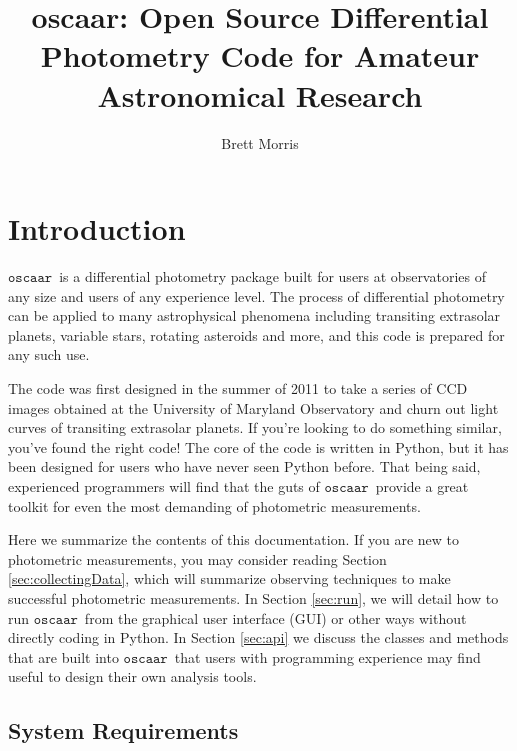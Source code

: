 \documentclass{article}
\begin{document}
\title{\textbf{oscaar}: Open Source Differential Photometry Code for Amateur Astronomical Research}
\author{Brett Morris}
\maketitle
\tableofcontents
\section{Introduction}

\newcommand{\oscaar}{$ \mathtt{oscaar}$\ }
\newcommand{\code}[1]{\texttt{#1}}
\newcommand{\init}{\code{init.par}\ }

\oscaar is a differential photometry package built for users at observatories of any size and users of any experience level. The process of differential photometry can be applied to many astrophysical phenomena including transiting extrasolar planets, variable stars, rotating asteroids and more, and this code is prepared for any such use. 

The code was first designed in the summer of 2011 to take a series of CCD images obtained at the University of Maryland Observatory and churn out light curves of transiting extrasolar planets. If you're looking to do something similar, you've found the right code! The core of the code is written in Python, but it has been designed for users who have never seen Python before. That being said, experienced programmers will find that the guts of \oscaar provide a great toolkit for even the most demanding of photometric measurements.

Here we summarize the contents of this documentation. If you are new to photometric measurements, you may consider reading Section \ref{sec:collectingData}, which will summarize observing techniques to make successful photometric measurements. In Section \ref{sec:run}, we will detail how to run \oscaar from the graphical user interface (GUI) or other ways without directly coding in Python. In Section \ref{sec:api} we discuss the classes and methods that are built into \oscaar that users with programming experience may find useful to design their own analysis tools. 

\subsection{System Requirements} \label{sec:systemRequirements}
\end{document}

